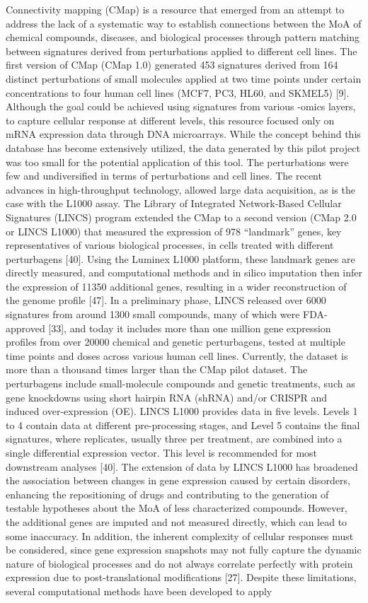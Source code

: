 Connectivity mapping (CMap) is a resource that emerged from an attempt to address the lack of a systematic way to establish connections between the MoA of chemical compounds, diseases, and biological processes through pattern matching between signatures derived from perturbations applied to different cell lines. The first version of CMap (CMap 1.0) generated 453 signatures derived from 164 distinct perturbations of small molecules applied at two time points under certain concentrations to four human cell lines (MCF7, PC3, HL60, and SKMEL5) [9]. Although the goal could be achieved using signatures from various -omics layers, to capture cellular response at different levels, this resource focused only on mRNA expression data through DNA microarrays. While the concept behind this database has become extensively utilized, the data generated by this pilot project was too small for the potential application of this tool. The perturbations were few and undiversified in terms of perturbations and cell lines. The recent advances in high-throughput technology, allowed large data acquisition, as is the case with the L1000 assay. The Library of Integrated Network-Based Cellular Signatures (LINCS) program extended the CMap to a second version (CMap 2.0 or LINCS L1000) that measured the expression of 978 “landmark” genes, key representatives of various biological processes, in cells treated with different perturbagens [40]. Using the Luminex L1000 platform, these landmark genes are directly measured, and computational methods and in silico imputation then infer the expression of 11350 additional genes, resulting in a wider reconstruction of the genome profile [47]. In a preliminary phase, LINCS released over 6000 signatures from around 1300 small compounds, many of which were FDA-approved [33], and today it includes more than one million gene expression profiles from over 20000 chemical and genetic perturbagens, tested at multiple time points and doses across various human cell lines. Currently, the dataset is more than a thousand times larger than the CMap pilot dataset. The perturbagens include small-molecule compounds and genetic treatments, such as gene knockdowns using short hairpin RNA (shRNA) and/or CRISPR and induced over-expression (OE). LINCS L1000 provides data in five levels. Levels 1 to 4 contain data at different pre-processing stages, and Level 5 contains the final signatures, where replicates, usually three per treatment, are combined into a single differential expression vector. This level is recommended for most downstream analyses [40]. The extension of data by LINCS L1000 has broadened the association between changes in gene expression caused by certain disorders, enhancing the repositioning of drugs and contributing to the generation of testable hypotheses about the MoA of less characterized compounds. However, the additional genes are imputed and not measured directly, which can lead to some inaccuracy. In addition, the inherent complexity of cellular responses must be considered, since gene expression snapshots may not fully capture the dynamic nature of biological processes and do not always correlate perfectly with protein expression due to post-translational modifications [27]. Despite these limitations, several computational methods have been developed to apply 